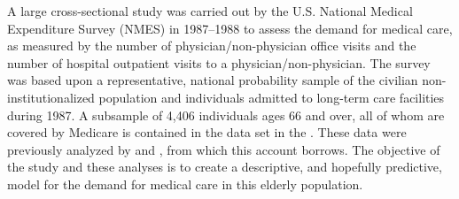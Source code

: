 \documentclass[11pt]{book}\usepackage[]{graphicx}\usepackage[]{color}
\begin{document}
A large cross-sectional study was carried out by the U.S. National Medical Expenditure
Survey (NMES) in 1987--1988 to assess the demand for medical care, as
measured by the number of physician/non-physician office visits and the
number of hospital outpatient visits to a physician/non-physician.
The survey was based upon a representative, national probability sample of the civilian non-institutionalized population and individuals admitted to long-term care facilities during 1987.  A subsample of 4,406
individuals ages 66 and over, all of whom are covered by Medicare is contained
in the  data set in the .
These data were previously analyzed by \citet{DebTrivedi:1997}
and \citet{Zeileis-etal:2008}, from which this account borrows.
The objective of the study and these analyses is to create a descriptive, and hopefully predictive, model
for the demand for medical care in this elderly population.
\end{document}
